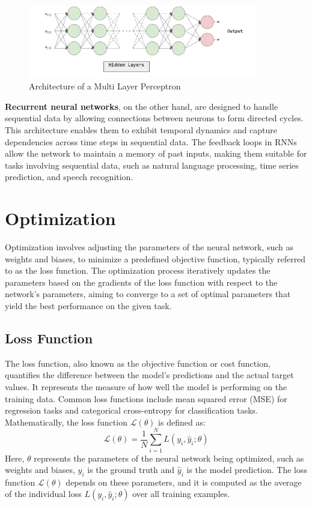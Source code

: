 \begin{figure}[ht]
    \centering
    \includegraphics[width=10cm]{images/Theory-DL/MLP.png}
    \caption{Architecture of a Multi Layer Perceptron}
    \label{fig:MLP}
  \end{figure}
\textbf{Recurrent neural networks}, on the other hand, are designed to handle sequential data by allowing connections between neurons to form directed cycles. This architecture enables them to exhibit temporal dynamics and capture dependencies across time steps in sequential data. The feedback loops in RNNs allow the network to maintain a memory of past inputs, making them suitable for tasks involving sequential data, such as natural language processing, time series prediction, and speech recognition.
\section{Optimization}
Optimization involves adjusting the parameters of the neural network, such as weights and biases, to minimize a predefined objective function, typically referred to as the loss function. The optimization process iteratively updates the parameters based on the gradients of the loss function with respect to the network's parameters, aiming to converge to a set of optimal parameters that yield the best performance on the given task.
\subsection{Loss Function}
The loss function, also known as the objective function or cost function, quantifies the difference between the model's predictions and the actual target values. It represents the measure of how well the model is performing on the training data. Common loss functions include mean squared error (MSE) for regression tasks and categorical cross-entropy for classification tasks. Mathematically, the loss function $\mathcal{L}(\theta)$ is defined as: 
\begin{equation}
    \mathcal{L}(\theta)=\frac{1}{N} \sum_{i=1}^N L\left(y_i, \hat{y}_i ; \theta\right)
    \end{equation}
Here, $\theta$ represents the parameters of the neural network being optimized, such as weights and biases, $y_i$ is the ground truth and $\hat{y}_i $ is the model prediction. The loss function $\mathcal{L}(\theta)$ depends on these parameters, and it is computed as the average of the individual loss $L\left(y_i, \hat{y}_i ; \theta\right)$ over all training examples.
